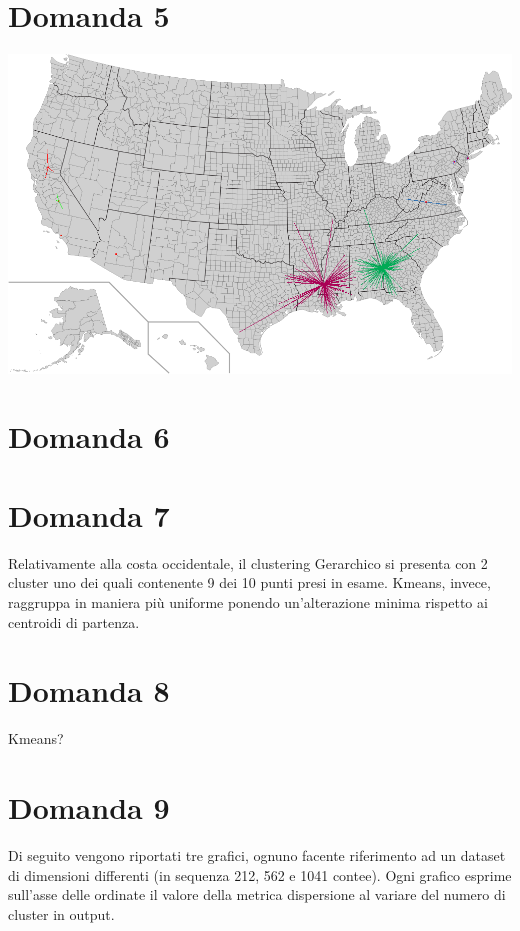 \documentclass{article}
\begin{document}
\section*{Domanda 5}
\includegraphics[width=1.0\linewidth, valign=t]{figures/Domanda5}

\section*{Domanda 6}

\section*{Domanda 7}
Relativamente alla costa occidentale, il clustering Gerarchico si presenta con 2 cluster uno dei quali contenente
9 dei 10 punti presi in esame. Kmeans, invece, raggruppa in maniera più uniforme ponendo un'alterazione minima
rispetto ai centroidi di partenza.

\section*{Domanda 8}
Kmeans?

\section*{Domanda 9}
Di seguito vengono riportati tre grafici, ognuno facente riferimento ad un dataset di dimensioni differenti (in sequenza 212, 562 e 1041 contee). 
Ogni grafico esprime sull'asse delle ordinate il valore della metrica dispersione al variare del numero di cluster in output. \newline
\end{document}
